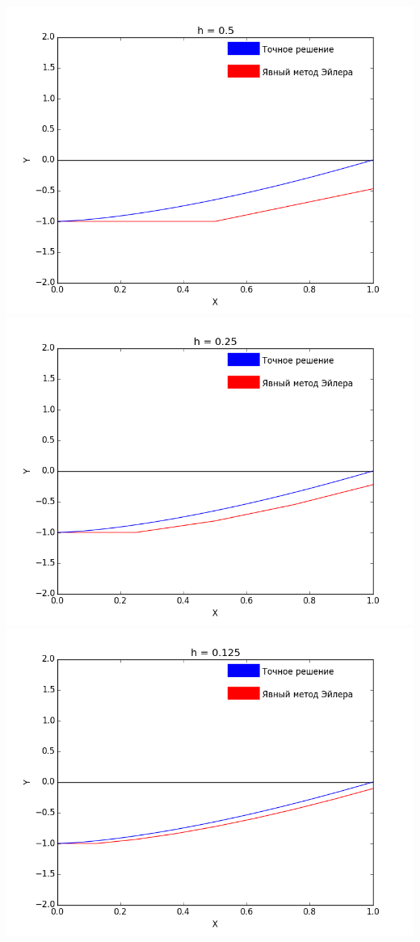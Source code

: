 \documentclass[12pt,a4paper]{article}
\begin{document}
		\noindent
        \includegraphics[scale=0.45]{explicitEulerGraph_Step=0_5}
        \includegraphics[scale=0.45]{explicitEulerGraph_Step=0_25}\\
        \includegraphics[scale=0.45]{explicitEulerGraph_Step=0_125}
\end{document}
